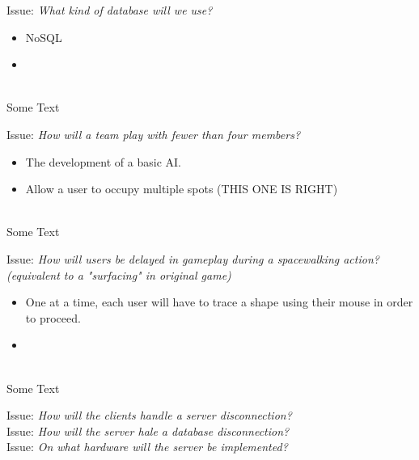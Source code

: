 Issue: \textit{What kind of database will we use?}
\\
  \begin{itemize}
    \item NoSQL
    \item 
  \end{itemize}
\\
Some Text

Issue: \textit{How will a team play with fewer than four members?}
\\
  \begin{itemize}
    \item The development of a basic AI.
    \item Allow a user to occupy multiple spots (THIS ONE IS RIGHT)
  \end{itemize}
\\
Some Text

Issue: \textit{How will users be delayed in gameplay during a spacewalking action? (equivalent to a "surfacing" in original game)}
\\
  \begin{itemize}
    \item One at a time, each user will have to trace a shape using their mouse in order to proceed.
    \item 
  \end{itemize}
\\
Some Text

Issue: \textit{How will the clients handle a server disconnection?}
\\

Issue: \textit{How will the server hale a database disconnection?}
\\

Issue: \textit{On what hardware will the server be implemented?}
\\
